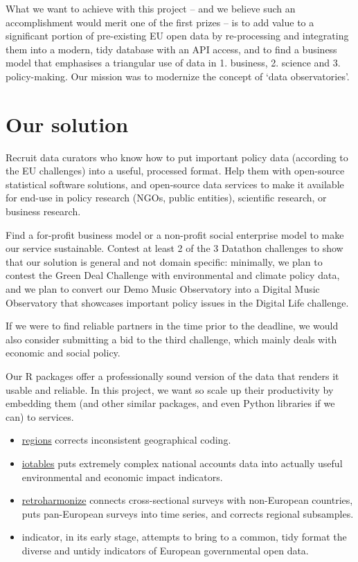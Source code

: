 \documentclass[
  a4paper,
  openany, a4paper, oneside]{book}
\providecommand{\tightlist}{%
  \setlength{\itemsep}{0pt}\setlength{\parskip}{0pt}}
\begin{document}
What we want to achieve with this project -- and we believe such an accomplishment would merit one of the first prizes -- is to add value to a significant portion of pre-existing EU open data by re-processing and integrating them into a modern, tidy database with an API access, and to find a business model that emphasises a triangular use of data in 1. business, 2. science and 3. policy-making. Our mission was to modernize the concept of `data observatories'.

\hypertarget{our-solution}{%
\section*{Our solution}\label{our-solution}}

Recruit data curators who know how to put important policy data (according to the EU challenges) into a useful, processed format.
Help them with open-source statistical software solutions, and open-source data services to make it available for end-use in policy research (NGOs, public entities), scientific research, or business research.

Find a for-profit business model or a non-profit social enterprise model to make our service sustainable.
Contest at least 2 of the 3 Datathon challenges to show that our solution is general and not domain specific: minimally, we plan to contest the Green Deal Challenge with environmental and climate policy data, and we plan to convert our Demo Music Observatory into a Digital Music Observatory that showcases important policy issues in the Digital Life challenge.

If we were to find reliable partners in the time prior to the deadline, we would also consider submitting a bid to the third challenge, which mainly deals with economic and social policy.

Our R packages offer a professionally sound version of the data that renders it usable and reliable. In this project, we want so scale up their productivity by embedding them (and other similar packages, and even Python libraries if we can) to services.

\begin{itemize}
\tightlist
\item
  \href{https://regions.dataobservatory.eu/}{regions} corrects inconsistent geographical coding.
\item
  \href{https://iotables.dataobservatory.eu/}{iotables} puts extremely complex national accounts data into actually useful environmental and economic impact indicators.
\item
  \href{https://retroharmonize.dataobservatory.eu/}{retroharmonize} connects cross-sectional surveys with non-European countries, puts pan-European surveys into time series, and corrects regional subsamples.
\item
  indicator, in its early stage, attempts to bring to a common, tidy format the diverse and untidy indicators of European governmental open data.
\end{itemize}
\end{document}
